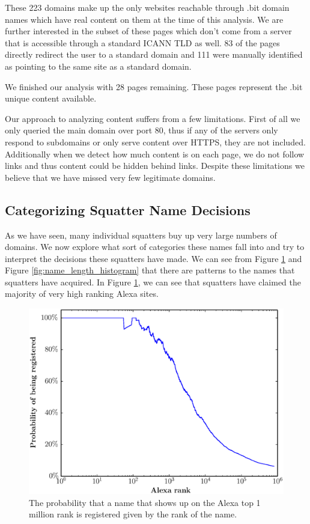 These 223 domains make up the only websites reachable through .bit domain names which have real content on them at the time of this analysis. We are further interested in the subset of these pages which don't come from a server that is accessible through a standard ICANN TLD as well.  83 of the pages directly redirect the user to a standard domain and 111 were manually identified as pointing to the same site as a standard domain.

We finished our analysis with 28 pages remaining. These pages represent the .bit unique content available.

Our approach to analyzing content suffers from a few limitations. First of all we only queried the main domain over port 80, thus if any of the servers only respond to subdomains or only serve content over HTTPS, they are not included. Additionally when we detect how much content is on each page, we do not follow links and thus content could be hidden behind links. Despite these limitations we believe that we have missed very few legitimate domains.

\subsection{Categorizing Squatter Name Decisions}

As we have seen, many individual squatters buy up very large numbers of domains. We now explore what sort of categories these names fall into and try to interpret the decisions these squatters have made. We can see from Figure \ref{fig:alexa_probability} and Figure \ref{fig:name_length_histogram} that there are patterns to the names that squatters have acquired. In Figure \ref{fig:alexa_probability}, we can see that squatters have claimed the majority of very high ranking Alexa sites. 

\begin{figure}
  \centering
  \includegraphics[width=\columnwidth]{figures/alexa_probability}
  \caption{The probability that a name that shows up on the Alexa top 1 million rank is registered given by the rank of the name.}
  \label{fig:alexa_probability}
\end{figure}

